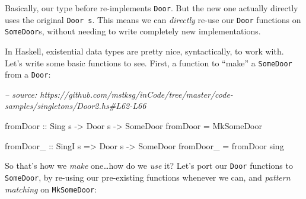 \documentclass[]{article}
\newenvironment{Shaded}{}{}
\newcommand{\CommentTok}[1]{\textcolor[rgb]{0.38,0.63,0.69}{\textit{#1}}}
\newcommand{\DataTypeTok}[1]{\textcolor[rgb]{0.56,0.13,0.00}{#1}}
\newcommand{\FunctionTok}[1]{\textcolor[rgb]{0.02,0.16,0.49}{#1}}
\newcommand{\KeywordTok}[1]{\textcolor[rgb]{0.00,0.44,0.13}{\textbf{#1}}}
\newcommand{\NormalTok}[1]{#1}
\newcommand{\OtherTok}[1]{\textcolor[rgb]{0.00,0.44,0.13}{#1}}
\begin{document}
Basically, our type before re-implements \texttt{Door}. But the new one actually
directly uses the original \texttt{Door\ s}. This means we can \emph{directly}
re-use our \texttt{Door} functions on \texttt{SomeDoor}s, without needing to
write completely new implementations.

In Haskell, existential data types are pretty nice, syntactically, to work with.
Let's write some basic functions to see. First, a function to ``make'' a
\texttt{SomeDoor} from a \texttt{Door}:

\begin{Shaded}
\begin{Highlighting}[]
\CommentTok{-- source: https://github.com/mstksg/inCode/tree/master/code-samples/singletons/Door2.hs#L62-L66}

\OtherTok{fromDoor ::} \DataTypeTok{Sing}\NormalTok{ s }\OtherTok{->} \DataTypeTok{Door}\NormalTok{ s }\OtherTok{->} \DataTypeTok{SomeDoor}
\NormalTok{fromDoor }\FunctionTok{=} \DataTypeTok{MkSomeDoor}

\OtherTok{fromDoor_ ::} \DataTypeTok{SingI}\NormalTok{ s }\OtherTok{=>} \DataTypeTok{Door}\NormalTok{ s }\OtherTok{->} \DataTypeTok{SomeDoor}
\NormalTok{fromDoor_ }\FunctionTok{=}\NormalTok{ fromDoor sing}
\end{Highlighting}
\end{Shaded}

So that's how we \emph{make} one\ldots{}how do we \emph{use} it? Let's port our
\texttt{Door} functions to \texttt{SomeDoor}, by re-using our pre-existing
functions whenever we can, and \emph{pattern matching} on \texttt{MkSomeDoor}:

\begin{Shaded}
\end{Shaded}
\end{document}
